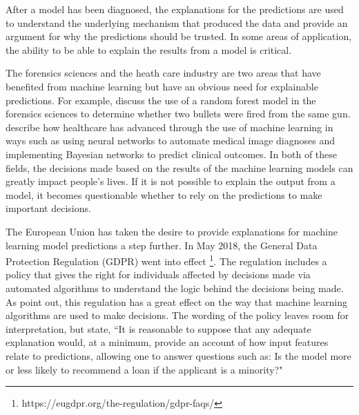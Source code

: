 \documentclass[AMS,STIX2COL]{WileyNJD-v2}\usepackage[]{graphicx}\usepackage[]{color}
\begin{document}
After a model has been diagnosed, the explanations for the predictions are used to understand the underlying mechanism that produced the data and provide an argument for why the predictions should be trusted. In some areas of application, the ability to be able to explain the results from a model is critical.

The forensics sciences and the heath care industry are two areas that have benefited from machine learning but have an obvious need for explainable predictions. For example, \citet{hare:2016} discuss the use of a random forest model in the forensics sciences to determine whether two bullets were fired from the same gun. \citet{yu:2018} describe how healthcare has advanced through the use of machine learning in ways such as using neural networks to automate medical image diagnoses and implementing Bayesian networks to predict clinical outcomes. In both of these fields, the decisions made based on the results of the machine learning models can greatly impact people's lives. If it is not possible to explain the output from a model, it becomes questionable whether to rely on the predictions to make important decisions.

The European Union has taken the desire to provide explanations for machine learning model predictions a step further. In May 2018, the General Data Protection Regulation (GDPR) went into effect \footnote{https://eugdpr.org/the-regulation/gdpr-faqs/}. The regulation includes a policy that gives the right for individuals affected by decisions made via automated algorithms to understand the logic behind the decisions being made. As \citet{goodman:2016} point out, this regulation has a great effect on the way that machine learning algorithms are used to make decisions. The wording of the policy leaves room for interpretation, but  \citet{goodman:2016} state, ``It is reasonable to suppose that any adequate explanation would, at a minimum, provide an account of how input features relate to predictions, allowing one to answer questions such as: Is the model more or less likely to recommend a loan if the applicant is a minority?"
\end{document}
